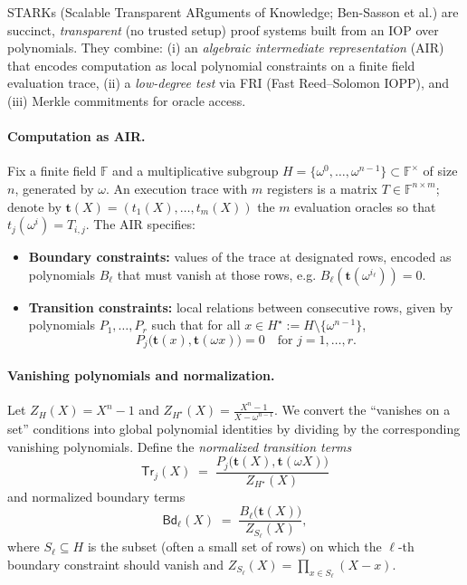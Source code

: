 STARKs (Scalable Transparent ARguments of Knowledge; Ben-Sasson et al.) are
succinct, \emph{transparent} (no trusted setup) proof systems built from an
IOP over polynomials. They combine:
(i) an \emph{algebraic intermediate representation} (AIR) that encodes
computation as local polynomial constraints on a finite field evaluation trace,
(ii) a \emph{low-degree test} via FRI (Fast Reed–Solomon IOPP),
and (iii) Merkle commitments for oracle access.

\paragraph{Computation as AIR.}
Fix a finite field $\mathbb{F}$ and a multiplicative subgroup
$H=\{\omega^0,\dots,\omega^{n-1}\}\subset \mathbb{F}^\times$ of size $n$,
generated by $\omega$.
An execution trace with $m$ registers is a matrix
$T \in \mathbb{F}^{n\times m}$; denote by
$\mathbf{t}(X) = (t_1(X),\dots,t_m(X))$ the $m$ evaluation oracles so that
$t_j(\omega^i)=T_{i,j}$.
The AIR specifies:
\begin{itemize}
  \item \textbf{Boundary constraints:} values of the trace at designated rows, encoded as
  polynomials $B_\ell$ that must vanish at those rows, e.g.
  $B_\ell(\mathbf{t}(\omega^{i_\ell}))=0$.
  \item \textbf{Transition constraints:} local relations between consecutive rows, given by
  polynomials $P_1,\dots,P_r$ such that for all $x\in H^\star := H\setminus\{\omega^{n-1}\}$,
  \[
    P_j\big(\mathbf{t}(x),\mathbf{t}(\omega x)\big)=0
    \quad \text{for } j=1,\dots,r.
  \]
\end{itemize}

\paragraph{Vanishing polynomials and normalization.}
Let $Z_H(X)=X^n-1$ and $Z_{H^\star}(X)=\frac{X^n-1}{X-\omega^{n-1}}$.
We convert the “vanishes on a set” conditions into global polynomial identities by dividing by the corresponding vanishing polynomials. Define the \emph{normalized transition terms}
\[
  \mathsf{Tr}_j(X)
  \;=\; \frac{P_j\big(\mathbf{t}(X),\mathbf{t}(\omega X)\big)}{Z_{H^\star}(X)}
\]
and normalized boundary terms
\[
  \mathsf{Bd}_\ell(X)
  \;=\; \frac{B_\ell\big(\mathbf{t}(X)\big)}{Z_{S_\ell}(X)},
\]
where $S_\ell\subseteq H$ is the subset (often a small set of rows) on which the $\ell$-th boundary
constraint should vanish and $Z_{S_\ell}(X)=\prod_{x\in S_\ell} (X-x)$.

